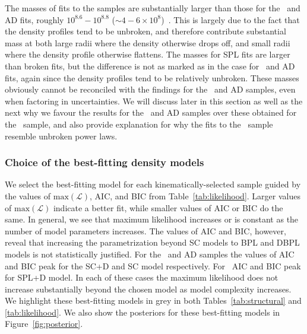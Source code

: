 The masses of fits to the \JRLz samples are substantially larger than those for the \eLz\ and AD fits, roughly $10^{8.6}-10^{8.8}$ ($\sim 4-6 \times10^{8}$)~\Msun. This is largely due to the fact that the density profiles tend to be unbroken, and therefore contribute substantial mass at both large radii where the density otherwise drops off, and small radii where the density profile otherwise flattens. The masses for SPL fits are larger than broken fits, but the difference is not as marked as in the case for \eLz\ and AD fits, again since the density profiles tend to be relatively unbroken. These masses obviously cannot be reconciled with the findings for the \eLz\ and AD samples, even when factoring in uncertainties. We will discuss later in this section as well as the next why we favour the results for the \eLz\ and AD samples over these obtained for the \JRLz\ sample, and also provide explanation for why the fits to the \JRLz\ sample resemble unbroken power laws.

\subsubsection{Choice of the best-fitting density models}

We select the best-fitting model for each kinematically-selected sample guided by the values of $\mathrm{max}(\mathcal{L})$, AIC, and BIC from Table~\ref{tab:likelihood}. Larger values of $\mathrm{max}(\mathcal{L})$ indicate a better fit, while smaller values of AIC or BIC do the same. In general, we see that maximum likelihood increases or is constant as the number of model parameters increases. The values of AIC and BIC, however, reveal that increasing the parametrization beyond SC models to BPL and DBPL models is not statistically justified. For the \eLz\ and AD samples the values of AIC and BIC peak for the SC+D and SC model respectively. For \JRLz\ AIC and BIC peak for SPL+D model. In each of these cases the maximum likelihood does not increase substantially beyond the chosen model as model complexity increases. We highlight these best-fitting models in grey in both Tables~\ref{tab:structural} and \ref{tab:likelihood}. We also show the posteriors for these best-fitting models in Figure~\ref{fig:posterior}.

